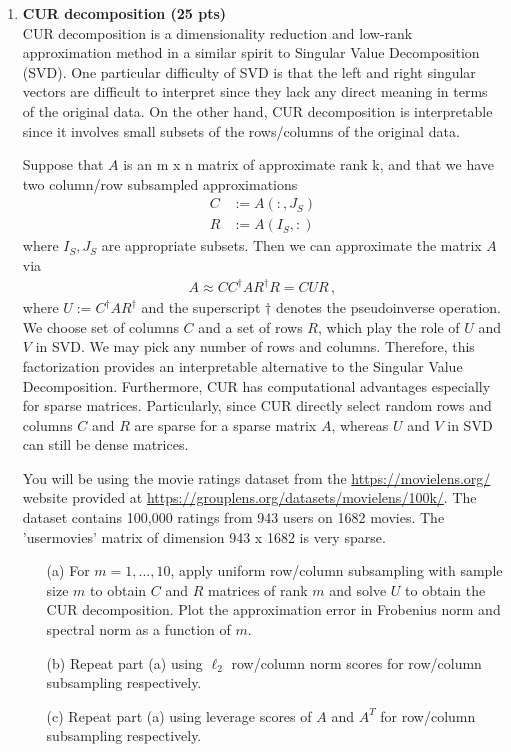 \begin{enumerate}
\newpage
\item \textbf{CUR decomposition (25 pts)\\} CUR decomposition is a dimensionality reduction and low-rank approximation method in a similar spirit to Singular Value Decomposition (SVD). One particular difficulty of SVD is that the left and right singular vectors are difficult to interpret since they lack any direct meaning in terms of the original data. On the other hand, CUR decomposition is interpretable since it involves small subsets of the rows/columns of the original data.


Suppose that $A$ is an m x n matrix of approximate rank k, and that we have two column/row subsampled approximations 
\begin{align}
    C&:=A(:,J_S)\\
    R&:=A(I_S,:)
\end{align}
%
where $I_S,J_S$ are appropriate subsets.
Then we can approximate the matrix $A$ via
\begin{align}
    A \approx CC^\dagger A R^\dagger R = C U R\,,
\end{align}
where $U:=C^\dagger A R^\dagger$ and the superscript $\dagger$ denotes the pseudoinverse operation. We choose set of columns $C$ and a set of rows $R$,
which play the role of $U$ and $V$ in  SVD. We may pick any number of rows and columns. Therefore, this factorization provides an interpretable alternative to the Singular Value Decomposition. Furthermore, CUR has computational advantages especially for sparse matrices. Particularly, since CUR directly select random rows and columns $C$ and $R$ are sparse for a sparse matrix $A$, whereas $U$ and $V$ in SVD can still be dense matrices.

 You will be using the movie ratings dataset from the \url{https://movielens.org/} website provided at \url{https://grouplens.org/datasets/movielens/100k/}. The dataset contains 100,000 ratings from 943 users on
1682 movies. The ’usermovies’ matrix of dimension 943 x 1682 is very sparse. 

\begin{itemize}
    \item[(a)] For $m=1,...,10$, apply uniform row/column subsampling with sample size $m$ to obtain $C$ and $R$ matrices of rank $m$ and solve $U$ to obtain the CUR decomposition. Plot the approximation error in Frobenius norm and spectral norm as a function of $m$.
    \item[(b)] Repeat part (a) using $\ell_2$ row/column norm scores for row/column subsampling respectively.
    \item[(c)] Repeat part (a) using leverage scores of $A$ and $A^T$ for row/column subsampling respectively.
\end{itemize}
    
\solution{
}




\end{enumerate}

